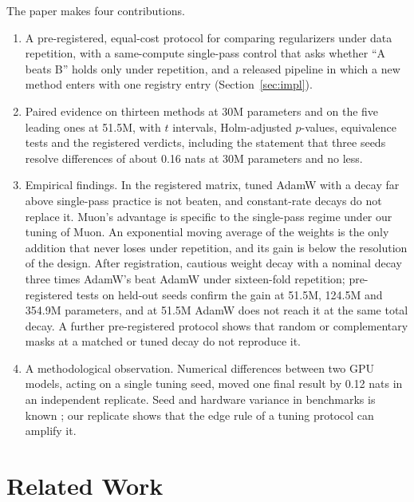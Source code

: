 \documentclass[twoside,11pt]{article}
\begin{document}
The paper makes four contributions.
\begin{enumerate}
\item A pre-registered, equal-cost protocol for comparing regularizers under data repetition, with a same-compute single-pass control that asks whether ``A beats B'' holds only under repetition, and a released pipeline in which a new method enters with one registry entry (Section~\ref{sec:impl}).
\item Paired evidence on thirteen methods at 30M parameters and on the five leading ones at 51.5M, with $t$ intervals, Holm-adjusted $p$-values, equivalence tests and the registered verdicts, including the statement that three seeds resolve differences of about 0.16 nats at 30M parameters and no less.
\item Empirical findings. In the registered matrix, tuned AdamW with a decay far above single-pass practice is not beaten, and constant-rate decays do not replace it. Muon's advantage is specific to the single-pass regime under our tuning of Muon. An exponential moving average of the weights is the only addition that never loses under repetition, and its gain is below the resolution of the design. After registration, cautious weight decay with a nominal decay three times AdamW's beat AdamW under sixteen-fold repetition; pre-registered tests on held-out seeds confirm the gain at 51.5M, 124.5M and 354.9M parameters, and at 51.5M AdamW does not reach it at the same total decay. A further pre-registered protocol shows that random or complementary masks at a matched or tuned decay do not reproduce it.
\item A methodological observation. Numerical differences between two GPU models, acting on a single tuning seed, moved one final result by 0.12 nats in an independent replicate. Seed and hardware variance in benchmarks is known \citep{bouthillier2021accounting,picard2021torch}; our replicate shows that the edge rule of a tuning protocol can amplify it.
\end{enumerate}

\section{Related Work}
\label{sec:related}
\end{document}
